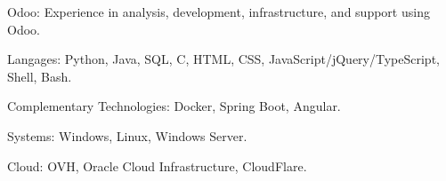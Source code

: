 \begin{indentsection}{\parindent}
  \begin{description*}
    \item[Odoo:] Experience in analysis, development, infrastructure, and support using Odoo.
    \item[Langages:] Python, Java, SQL, C, HTML, CSS, JavaScript/jQuery/TypeScript, Shell, Bash.
    \item[Complementary Technologies:] Docker, Spring Boot, Angular.
    \item[Systems:] Windows, Linux, Windows Server.
    \item[Cloud:] OVH, Oracle Cloud Infrastructure, CloudFlare.

  \end{description*}
\end{indentsection}
